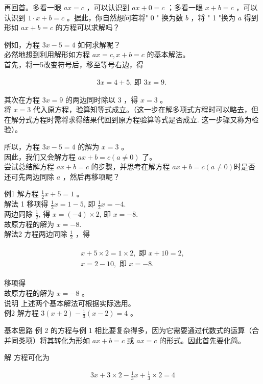\documentclass[10pt]{article}
\begin{document}
再回首。多看一眼 $a x=c$ ，可以认识到 $a x+0=c$ ；多看一眼 $x+b=c$ ，可以认识到 $1 \cdot x+b=c$ 。据此，你自然想问若将" 0 " 换为数 $b$ ，将 " 1 "换为 $a$ 得到形如 $a x+b=c$ 的方程可以求解吗？

例如，方程 $3 x-5=4$ 如何求解呢？\\
必然地想到利用解形如方程 $a x=c, x+b=c$ 的基本解法。\\
首先，将一5改变符号后，移至等号右边，得

\begin{align*}
3 x=4+5 \text {, 即 } 3 x=9 \text {. }
\end{align*}

其次在方程 $3 x=9$ 的两边同时除以 3 ，得 $x=3$ 。\\
将 $x=3$ 代入原方程，验算知等式成立。（这一步在解多项式方程时可以略去，但在解分式方程时需将求得结果代回到原方程验算等式是否成立. 这一步骤又称为检验）。

所以，方程 $3 x-5=4$ 的解为 $x=3$ 。\\
因此，我们又会解方程 $a x+b=c(a \neq 0)$ 了。\\
尝试总结解方程 $a x+b=c$ 的步骤，并思考在解方程 $a x+b=c(a \neq 0)$时是否还可先两边同除 $a$ ，然后再移项呢？

例1 解方程 $\frac{1}{2} x+5=1$ 。\\
解法 1 移项得 $\frac{1}{2} x=1-5$, 即 $\frac{1}{2} x=-4$.\\
两边同除 $\frac{1}{2}$, 得 $x=(-4) \times 2$, 即 $x=-8$.\\
故原方程的解为 $x=-8$.\\
解法2 方程两边同除 $\frac{1}{2}$ ，得

\begin{align*}
\begin{gathered}
x+5 \times 2=1 \times 2, \text { 即 } x+10=2, \\
x=2-10, \text { 即 } x=-8 .
\end{gathered}
\end{align*}

移项得\\
故原方程的解为 $x=-8$ 。\\
说明 上述两个基本解法可根据实际选用。\\
例2 解方程 $3(x+2)-\frac{1}{3}(x-2)=4$ 。

基本思路 例 2 的方程与例 1 相比要复杂得多，因为它需要通过代数式的运算（合并同类项）将其转化为形如 $a x+b=c$ 或 $a x=c$ 的形式。因此首先要化简。

解 方程可化为

\begin{align*}
3 x+3 \times 2-\frac{1}{3} x+\frac{1}{3} \times 2=4
\end{align*}
\end{document}
